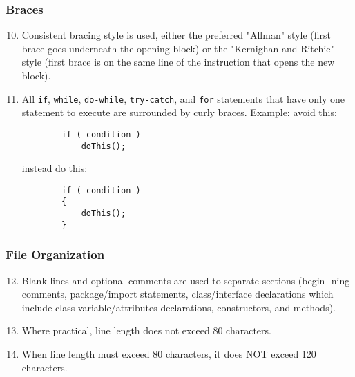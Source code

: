 \subsubsection{Braces} \label{sssec:braces}

\begin{enumerate}
\setcounter{enumi}{9}

\item Consistent bracing style is used, either the preferred "Allman" style (first brace goes underneath the opening block) or the "Kernighan and Ritchie" style (first brace is on the same line of the instruction that opens the new block).

\item All \texttt{if}, \texttt{while}, \texttt{do-while}, \texttt{try-catch}, and \texttt{for} statements that have only one statement to execute are surrounded by curly braces. Example: avoid this:

\begin{lstlisting}
        if ( condition )
            doThis();
\end{lstlisting}

instead do this:
\begin{lstlisting}
        if ( condition )
        {
            doThis();
        }
\end{lstlisting}

\end{enumerate}

\subsubsection{File Organization} \label{sssec:file-org}

\begin{enumerate}
\setcounter{enumi}{11}

\item Blank lines and optional comments are used to separate sections (begin- ning comments, package/import statements, class/interface declarations which include class variable/attributes declarations, constructors, and methods).

\item Where practical, line length does not exceed 80 characters.

\item When line length must exceed 80 characters, it does NOT exceed 120 characters.

\end{enumerate}

